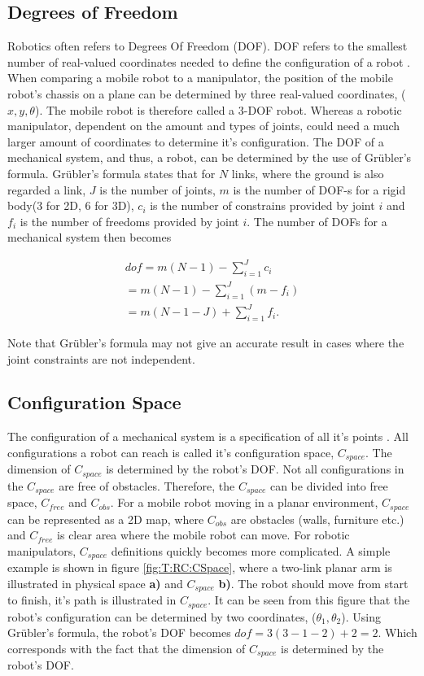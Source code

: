 \subsection{Degrees of Freedom}
Robotics often refers to Degrees Of Freedom (DOF). DOF refers to the smallest number of real-valued coordinates needed to define the configuration of a robot \cite{LynchKevin2017Mr:m}. When comparing a mobile robot to a manipulator, the position of the mobile robot's chassis on a plane can be determined by three real-valued coordinates, ($x,y,\theta$). The mobile robot is therefore called a 3-DOF robot. Whereas a robotic manipulator, dependent on the amount and types of joints, could need a much larger amount of coordinates to determine it's configuration. The DOF of a mechanical system, and thus, a robot, can be determined by the use of Gr\"{u}bler's formula.  Gr\"{u}bler's formula states that for $N$ links, where the ground is also regarded a link, $J$ is the number of joints, $m$ is the number of DOF-s for a rigid body(3 for 2D, 6 for 3D), $c_i$ is the number of constrains  provided by joint $i$ and $f_i$ is the number of freedoms provided by joint $i$. The number of DOFs for a mechanical system then becomes

\begin{align}
\label{ec:DOFs}
    dof = m(N-1) -  \sum_{i=1}^{J} c_i \\
    = m(N-1) - \sum_{i=1}^{J}(m-f_i) \\
    = m(N-1-J) + \sum_{i=1}^{J}f_i.
\end{align}

Note that Gr\"ubler's formula may not give an accurate result in cases where the joint constraints are not independent\cite{LynchKevin2017Mr:m}.

\subsection{Configuration Space}
The configuration of a mechanical system is a specification of all it's points \cite{LynchKevin2017Mr:m}. All configurations a robot can reach is called it's configuration space, $C_{space}$. The dimension of $C_{space}$ is determined by the robot's DOF. Not all configurations in the $C_{space}$ are free of obstacles. Therefore, the $C_{space}$ can be divided into free space, $C_{free}$ and $C_{obs}$. For a mobile robot moving in a planar environment, $C_{space}$ can be represented as a 2D map, where $C_{obs}$ are obstacles (walls, furniture etc.) and $C_{free}$ is clear area where the mobile robot can move. For robotic manipulators, $C_{space}$ definitions quickly becomes more complicated. A simple example is shown in figure \ref{fig:T:RC:CSpace}, where a two-link planar arm is illustrated in physical space \textbf{a)} and $C_{space}$ \textbf{b)}. The robot should move from start to finish, it's path is illustrated in $C_{space}$. It can be seen from this figure that the robot's configuration can be determined by two coordinates, ($\theta_1, \theta_2$). Using Gr\"ubler's formula, the robot's DOF becomes $dof=3(3-1-2)+2=2$. Which corresponds with the fact that the dimension of $C_{space}$ is determined by the robot's DOF.

